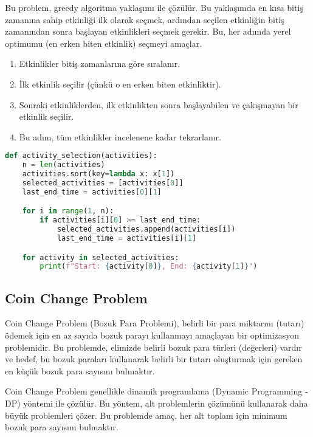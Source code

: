 Bu problem, greedy algoritma yaklaşımı ile çözülür. Bu yaklaşımda en kısa bitiş zamanına sahip etkinliği ilk olarak seçmek, ardından seçilen etkinliğin bitiş zamanından sonra başlayan etkinlikleri seçmek gerekir. Bu, her adımda yerel optimumu (en erken biten etkinlik) seçmeyi amaçlar.

\begin{enumerate}
    \item Etkinlikler bitiş zamanlarına göre sıralanır.
    \item İlk etkinlik seçilir (çünkü o en erken biten etkinliktir).
    \item Sonraki etkinliklerden, ilk etkinlikten sonra başlayabilen ve çakışmayan bir etkinlik seçilir.
    \item Bu adım, tüm etkinlikler incelenene kadar tekrarlanır.
\end{enumerate}

\begin{lstlisting}[language=Python]
def activity_selection(activities):
    n = len(activities)
    activities.sort(key=lambda x: x[1])
    selected_activities = [activities[0]]
    last_end_time = activities[0][1]

    for i in range(1, n):
        if activities[i][0] >= last_end_time:
            selected_activities.append(activities[i])
            last_end_time = activities[i][1]

    for activity in selected_activities:
        print(f"Start: {activity[0]}, End: {activity[1]}")
\end{lstlisting}

\newpage

\subsection{Coin Change Problem}

Coin Change Problem (Bozuk Para Problemi), belirli bir para miktarını (tutarı) ödemek için en az sayıda bozuk parayı kullanmayı amaçlayan bir optimizasyon problemidir. Bu problemde, elimizde belirli bozuk para türleri (değerleri) vardır ve hedef, bu bozuk paraları kullanarak belirli bir tutarı oluşturmak için gereken en küçük bozuk para sayısını bulmaktır.

Coin Change Problem genellikle dinamik programlama (Dynamic Programming - DP) yöntemi ile çözülür. Bu yöntem, alt problemlerin çözümünü kullanarak daha büyük problemleri çözer. Bu problemde amaç, her alt toplam için minimum bozuk para sayısını bulmaktır.

